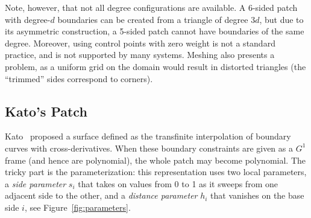 \documentclass[9pt,academicons]{article}
\begin{document}
Note, however, that not all degree configurations are available. A 6-sided patch with degree-$d$
boundaries can be created from a triangle of degree $3d$, but due to its asymmetric construction,
a 5-sided patch cannot have boundaries of the same degree. Moreover, using control points with zero
weight is not a standard practice, and is not supported by many systems. Meshing
also presents a problem, as a uniform grid on the domain would result in distorted triangles
(the ``trimmed'' sides correspond to corners).

\subsection{Kato's Patch}
\label{subsec:kato}
Kato~\cite{Kato:1991} proposed a surface defined as the transfinite interpolation of boundary
curves with cross-derivatives. When these boundary constraints are given as a $G^1$ frame (and hence
are polynomial), the whole patch may become polynomial. The tricky part is the parameterization:
this representation uses two local parameters, a \emph{side parameter} $s_i$
that takes on values from 0 to 1 as it sweeps from one adjacent side to the other,
and a \emph{distance parameter} $h_i$ that vanishes on the base side $i$, see
Figure~\ref{fig:parameters}.
\end{document}
